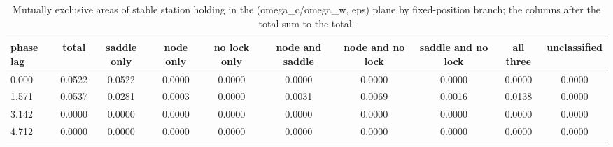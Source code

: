 \begin{table}
\caption{Mutually exclusive areas of stable station holding in the (omega_c/omega_w, eps) plane by fixed-position branch; the columns after the total sum to the total.}
\label{tab:T3_areas_exclusive}
\begin{ruledtabular}
\begin{tabular}{lccccccccc}
phase lag & total & saddle only & node only & no lock only & node and saddle & node and no lock & saddle and no lock & all three & unclassified \\
\hline
0.000 & 0.0522 & 0.0522 & 0.0000 & 0.0000 & 0.0000 & 0.0000 & 0.0000 & 0.0000 & 0.0000 \\
1.571 & 0.0537 & 0.0281 & 0.0003 & 0.0000 & 0.0031 & 0.0069 & 0.0016 & 0.0138 & 0.0000 \\
3.142 & 0.0000 & 0.0000 & 0.0000 & 0.0000 & 0.0000 & 0.0000 & 0.0000 & 0.0000 & 0.0000 \\
4.712 & 0.0000 & 0.0000 & 0.0000 & 0.0000 & 0.0000 & 0.0000 & 0.0000 & 0.0000 & 0.0000 \\
\end{tabular}
\end{ruledtabular}
\end{table}
